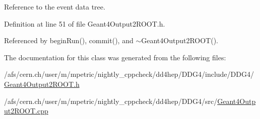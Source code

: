 Reference to the event data tree. 

Definition at line 51 of file Geant4Output2ROOT.h.

Referenced by beginRun(), commit(), and $\sim$Geant4Output2ROOT().

The documentation for this class was generated from the following files:\begin{DoxyCompactItemize}
\item 
/afs/cern.ch/user/m/mpetric/nightly\_\-cppcheck/dd4hep/DDG4/include/DDG4/\hyperlink{_geant4_output2_r_o_o_t_8h}{Geant4Output2ROOT.h}\item 
/afs/cern.ch/user/m/mpetric/nightly\_\-cppcheck/dd4hep/DDG4/src/\hyperlink{_geant4_output2_r_o_o_t_8cpp}{Geant4Output2ROOT.cpp}\end{DoxyCompactItemize}
